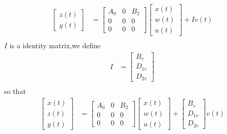 \documentclass[twocolumn]{autart}    %
\begin{document}
\begin{pf}
\begin{equation}
\begin{aligned}
\begin{bmatrix}
                z(t) \\
                y(t) 
            \end{bmatrix} & = \begin{bmatrix}
                A_{0} & 0 & B_{2}\\
                0 & 0 & 0\\
                0 & 0 & 0
            \end{bmatrix}\begin{bmatrix}
                x(t) \\
                w(t) \\
                u(t) 
            \end{bmatrix} + Iv(t)\\
        \end{aligned}
    \end{equation}
    $I$ is a identity matrix,we define
    \begin{equation}
        \begin{aligned}
            I & = \begin{bmatrix}
                B_{v} \\
                D_{1v} \\
                D_{2v} 
            \end{bmatrix} \\
        \end{aligned}
    \end{equation}
    so that
    \begin{equation}
        \begin{aligned}
            \begin{bmatrix}
                \dot{x}(t) \\
                z(t) \\
                y(t) 
            \end{bmatrix} & = \begin{bmatrix}
                A_{0} & 0 & B_{2}\\
                0 & 0 & 0\\
                0 & 0 & 0
            \end{bmatrix}\begin{bmatrix}
                x(t) \\
                w(t) \\
                u(t) 
            \end{bmatrix} + \begin{bmatrix}
                B_{v} \\
                D_{1v} \\
                D_{2v} 
            \end{bmatrix}v(t)\\
        \end{aligned}
    \end{equation}
    

\end{pf}
\end{document}
